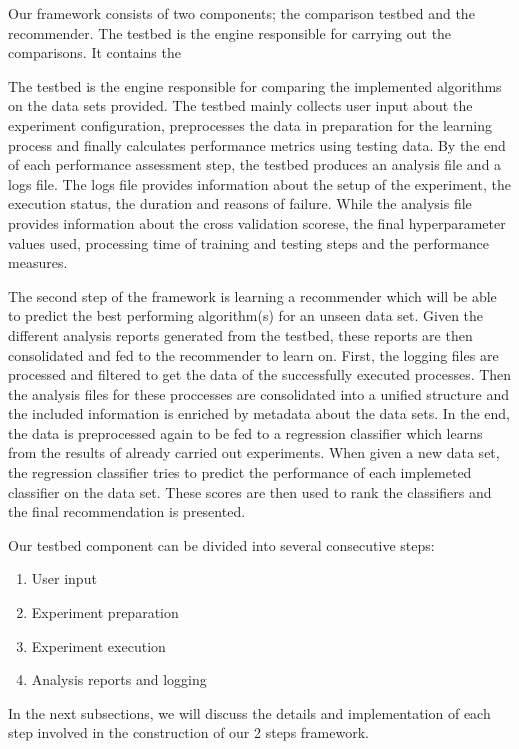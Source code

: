 Our framework consists of two components; the comparison testbed and the recommender.
The testbed is the engine responsible for carrying out the comparisons.
It contains the

The testbed is the engine responsible for comparing the implemented algorithms on the data sets provided.
The testbed mainly collects user input about the experiment configuration, preprocesses the data in preparation for the learning process
and finally calculates performance metrics using testing data.
By the end of each performance assessment step, the testbed produces an analysis file and a logs file.
The logs file provides information about the setup of the experiment, the execution status, the duration and reasons of failure.
While the analysis file provides information about the cross validation scorese, the final hyperparameter values used, processing time of training and testing steps and the performance measures.

The second step of the framework is learning a recommender which will be able to predict the best performing algorithm(s) for an unseen data set.
Given the different analysis reports generated from the testbed, these reports are then consolidated and fed to the recommender to learn on.
First, the logging files are processed and filtered to get the data of the successfully executed processes.
Then the analysis files for these proccesses are consolidated into a unified structure and the included information is enriched by metadata about the data sets.
In the end, the data is preprocessed again to be fed to a regression classifier which learns from the results of already carried out experiments.
When given a new data set, the regression classifier tries to predict the performance of each implemeted classifier on the data set.
These scores are then used to rank the classifiers and the final recommendation is presented.

Our testbed component can be divided into several consecutive steps:
\begin{enumerate}
    \item User input
    \item Experiment preparation
    \item Experiment execution
    \item Analysis reports and logging
\end{enumerate}

In the next subsections, we will discuss the details and implementation of each step involved in the construction of our 2 steps framework.

